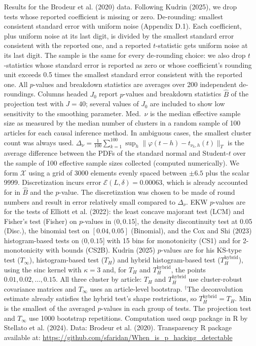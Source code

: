 \begin{table}[htbp]
\medskip
\begin{minipage}{\linewidth}
Results for the Brodeur et al. (2020) data. Following Kudrin (2025), we drop tests whose reported coefficient is missing or zero.
De-rounding: smallest consistent standard error with uniform noise (Appendix D.1). Each coefficient, plus uniform noise at its last digit, is divided by the smallest standard error consistent with the reported one, and a reported $t$-statistic gets uniform noise at its last digit.
The sample is the same for every de-rounding choice: we also drop $t$-statistics whose standard error is reported as zero or whose coefficient's rounding unit exceeds 0.5 times the smallest standard error consistent with the reported one.
All $p$-values and breakdown statistics are averages over 200 independent de-roundings.
Columns headed $J_0$ report $p$-values and breakdown statistics $\widehat{B}$ of the projection test with $J=40$; several values of $J_0$ are included to show low sensitivity to the smoothing parameter.
Med.\ $\nu$ is the median effective sample size as measured by the median number of clusters in a random sample of 100 articles for each causal inference method.
In ambiguous cases, the smallest cluster count was always used.
$\Delta_\nu=\frac{1}{100}\sum_{k=1}^{100}\sup_h\|\varphi(t-h)-t_{\nu_k,h}(t)\|_T$ is the average difference between the PDFs of the standard normal and Student-$t$ over the sample of 100 effective sample sizes collected (computed numerically).
We form $\mathcal{X}$ using a grid of 3000 elements evenly spaced between $\pm 6.5$ plus the scalar 9999.
Discretization incurs error $\mathcal{E}(L,\delta)=0.00063$, which is already accounted for in $\widehat{B}$ and the $p$-value.
The discretization was chosen to be made of round numbers and result in error relatively small compared to $\Delta_\nu$.
EKW $p$-values are for the tests of Elliott et al. (2022): the least concave majorant test (LCM) and Fisher's test (Fisher) on $p$-values in $(0,0.15]$, the density discontinuity test at 0.05 (Disc.), the binomial test on $[0.04,0.05]$ (Binomial), and the Cox and Shi (2023) histogram-based tests on $(0,0.15]$ with 15 bins for monotonicity (CS1) and for 2-monotonicity with bounds (CS2B).
Kudrin (2025) $p$-values are for his KS-type test ($T_\infty$), histogram-based test ($T_H$) and hybrid histogram-based test ($T_H^{\mathrm{hybrid}}$), using the sinc kernel with $\kappa=3$ and, for $T_H$ and $T_H^{\mathrm{hybrid}}$, the points $0.01,0.02,\ldots,0.15$.
All three cluster by article: $T_H$ and $T_H^{\mathrm{hybrid}}$ use cluster-robust covariance matrices and $T_\infty$ uses an article-level bootstrap.
$^\dagger$The deconvolution estimate already satisfies the hybrid test's shape restrictions, so $T_H^{\mathrm{hybrid}}=T_H$.
Min is the smallest of the averaged $p$-values in each group of tests.
The projection test and $T_\infty$ use 1000 bootstrap repetitions.
Computation used osqp package in R by Stellato et al. (2024). Data: Brodeur et al. (2020).
Transparency R package available at: \url{https://github.com/sfaridan/When_is_p_hacking_detectable}
\end{minipage}
\end{table}
